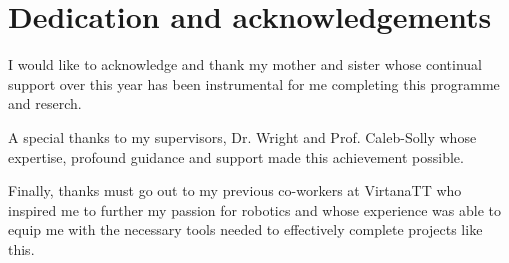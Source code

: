 %
%

\chapter*{Dedication and acknowledgements}
\begin{SingleSpace}
    I would like to acknowledge and thank my mother and sister whose continual support over this year has been instrumental for me completing this programme and reserch.

    A special thanks to my supervisors, Dr. Wright and Prof. Caleb-Solly whose expertise, profound guidance and support made this achievement possible.

    Finally, thanks must go out to my previous co-workers at VirtanaTT who inspired me to further my passion for robotics and whose experience was able to equip me with the necessary tools needed to effectively complete projects like this.
\end{SingleSpace}
\clearpage